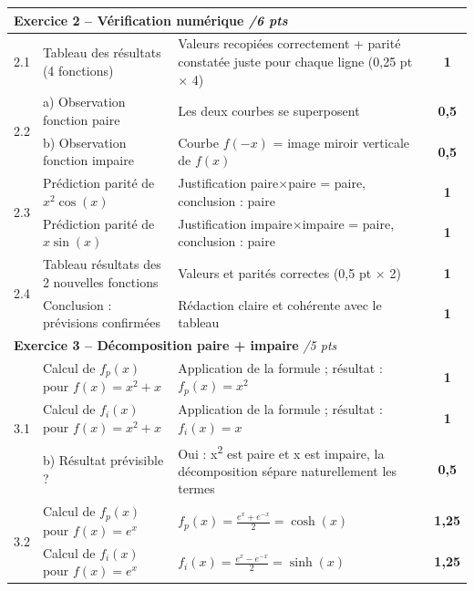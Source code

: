 \documentclass[12pt,a4paper]{article}
\begin{document}
\begin{tabular}{|p{0.5cm}|p{7.5cm}|p{5.5cm}|c|}
    \multicolumn{4}{|l|}{\cellcolor{exobg}\textbf{Exercice 2 -- Vérification numérique} \hfill \textit{/6 pts}} \\
    \hline
    2.1 & Tableau des résultats (4 fonctions)
    & Valeurs recopiées correctement + parité constatée juste pour chaque ligne (0,25 pt $\times$ 4)
    & \textbf{1} \\
    \hline
    \multirow{2}{*}{2.2} & a) Observation fonction paire & Les deux courbes se superposent & \textbf{0,5} \\
    \cline{2-4}
    & b) Observation fonction impaire & Courbe $f(-x)$ = image miroir verticale de $f(x)$ & \textbf{0,5} \\
    \hline
    \multirow{2}{*}{2.3} & Prédiction parité de $x^2\cos(x)$ & Justification paire$\times$paire = paire, conclusion : paire & \textbf{1} \\
    \cline{2-4}
    & Prédiction parité de $x\sin(x)$ & Justification impaire$\times$impaire = paire, conclusion : paire & \textbf{1} \\
    \hline
    \multirow{2}{*}{2.4} & Tableau résultats des 2 nouvelles fonctions & Valeurs et parités correctes (0,5 pt $\times$ 2) & \textbf{1} \\
    \cline{2-4}
    & Conclusion : prévisions confirmées & Rédaction claire et cohérente avec le tableau & \textbf{1} \\
    \hline

    \multicolumn{4}{|l|}{\cellcolor{exobg}\textbf{Exercice 3 -- Décomposition paire + impaire} \hfill \textit{/5 pts}} \\
    \hline
    \multirow{3}{*}{3.1} & Calcul de $f_p(x)$ pour $f(x) = x^2+x$ & Application de la formule ; résultat : $f_p(x) = x^2$ & \textbf{1} \\
    \cline{2-4}
    & Calcul de $f_i(x)$ pour $f(x) = x^2+x$ & Application de la formule ; résultat : $f_i(x) = x$ & \textbf{1} \\
    \cline{2-4}
    & b) Résultat prévisible ? & Oui : x\textsuperscript{2} est paire et x est impaire, la décomposition sépare naturellement les termes & \textbf{0,5} \\
    \hline
    \multirow{2}{*}{3.2} & Calcul de $f_p(x)$ pour $f(x) = e^x$ & $f_p(x) = \frac{e^x+e^{-x}}{2} = \cosh(x)$ & \textbf{1,25} \\
    \cline{2-4}
    & Calcul de $f_i(x)$ pour $f(x) = e^x$ & $f_i(x) = \frac{e^x-e^{-x}}{2} = \sinh(x)$ & \textbf{1,25} \\
    \hline


\end{tabular}
\end{document}
